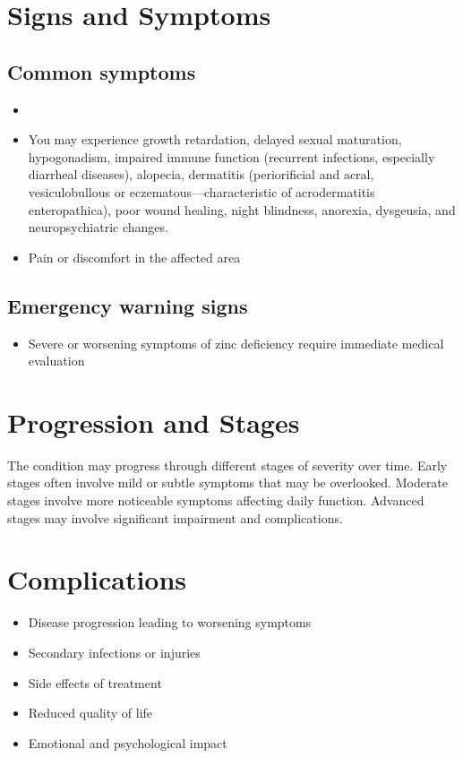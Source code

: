 \section{Signs and Symptoms}
\subsection{Common symptoms}
\begin{itemize}[noitemsep]
  \item \item You may experience growth retardation, delayed sexual maturation, hypogonadism, impaired immune function (recurrent infections, especially diarrheal diseases), alopecia, dermatitis (periorificial and acral, vesiculobullous or eczematous---characteristic of acrodermatitis enteropathica), poor wound healing, night blindness, anorexia, dysgeusia, and neuropsychiatric changes.
  \item Pain or discomfort in the affected area
  \end{itemize}
\subsection{Emergency warning signs}
\begin{itemize}[noitemsep]
  \item Severe or worsening symptoms of zinc deficiency require immediate medical evaluation
\end{itemize}
\section{Progression and Stages}
The condition may progress through different stages of severity over time. Early stages often involve mild or subtle symptoms that may be overlooked. Moderate stages involve more noticeable symptoms affecting daily function. Advanced stages may involve significant impairment and complications.
\section{Complications}
\begin{itemize}[noitemsep]
  \item Disease progression leading to worsening symptoms
  \item Secondary infections or injuries
  \item Side effects of treatment
  \item Reduced quality of life
  \item Emotional and psychological impact
\end{itemize}
